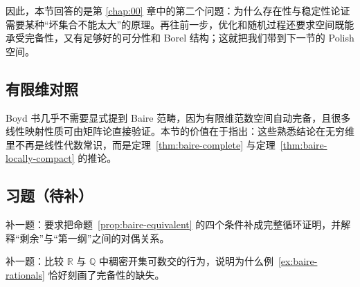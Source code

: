 因此，本节回答的是第 \ref{chap:00} 章中的第二个问题：为什么存在性与稳定性论证需要某种“坏集合不能太大”的原理。再往前一步，优化和随机过程还要求空间既能承受完备性，又有足够好的可分性和 Borel 结构；这就把我们带到下一节的 Polish 空间。

\subsection*{有限维对照}

Boyd 书几乎不需要显式提到 Baire 范畴，因为有限维范数空间自动完备，且很多线性映射性质可由矩阵论直接验证。本节的价值在于指出：这些熟悉结论在无穷维里不再是线性代数常识，而是定理~\ref{thm:baire-complete} 与定理~\ref{thm:baire-locally-compact} 的推论。

\subsection*{习题（待补）}

\begin{exercise}\label{exr:baire-equivalence-placeholder}
补一题：要求把命题~\ref{prop:baire-equivalent} 的四个条件补成完整循环证明，并解释“剩余”与“第一纲”之间的对偶关系。
\end{exercise}

\begin{exercise}[完备性桥接题占位]\label{exr:baire-complete-placeholder}
补一题：比较 $\mathbb R$ 与 $\mathbb Q$ 中稠密开集可数交的行为，说明为什么例~\ref{ex:baire-rationals} 恰好刻画了完备性的缺失。
\end{exercise}
